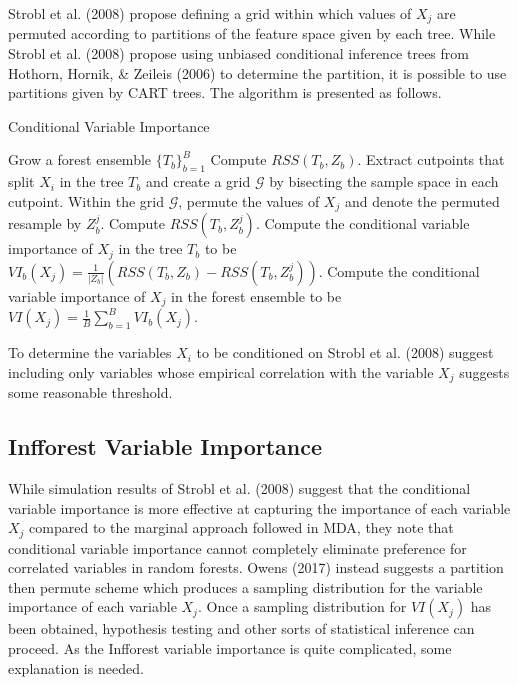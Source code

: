 \documentclass[12pt,twoside]{reedthesis}
\theoremstyle{definition}
\theoremstyle{definition}
\theoremstyle{definition}
\theoremstyle{remark}
\begin{document}
Strobl et al. (2008) propose defining a grid within which values of
\(X_j\) are permuted according to partitions of the feature space given
by each tree. While Strobl et al. (2008) propose using unbiased
conditional inference trees from Hothorn, Hornik, \& Zeileis (2006) to
determine the partition, it is possible to use partitions given by CART
trees. The algorithm is presented as follows.
\begin{algorithm}
    \caption{Conditional Variable Importance} \label{conditional variable importance}
      \begin{algorithmic}[1]
        \State Grow a forest ensemble $\{T_b\}_{b=1}^B$
            \State Compute $RSS(T_b,Z_b)$.
            \State Extract cutpoints that split $X_i$ in the tree $T_b$ and create a grid $\mathcal{G}$ by bisecting the sample space in each cutpoint.
            \EndFor
            \State Within the grid $\mathcal{G}$, permute the values of $X_j$ and denote the permuted resample by $Z_b^j$.
            \State Compute $RSS(T_b,Z_b^j)$.
            \State Compute the conditional variable importance of $X_j$ in the tree $T_b$ to be $VI_b(X_j)=\frac{1}{|Z_b|}\left(RSS(T_b,Z_b)-RSS(T_b,Z_b^j)\right)$.
            \EndFor
            \State Compute the conditional variable importance of $X_j$ in the forest ensemble to be $VI(X_j)=\frac{1}{B}\sum_{b=1}^B VI_b(X_j)$.
          \EndFor
      \end{algorithmic}
  \end{algorithm}
To determine the variables \(X_i\) to be conditioned on Strobl et al.
(2008) suggest including only variables whose empirical correlation with
the variable \(X_j\) suggests some reasonable threshold.

\subsection{Infforest Variable
Importance}\label{infforest-variable-importance}

While simulation results of Strobl et al. (2008) suggest that the
conditional variable importance is more effective at capturing the
importance of each variable \(X_j\) compared to the marginal approach
followed in MDA, they note that conditional variable importance cannot
completely eliminate preference for correlated variables in random
forests. Owens (2017) instead suggests a partition then permute scheme
which produces a sampling distribution for the variable importance of
each variable \(X_j\). Once a sampling distribution for \(VI(X_j)\) has
been obtained, hypothesis testing and other sorts of statistical
inference can proceed. As the Infforest variable importance is quite
complicated, some explanation is needed.
\end{document}
